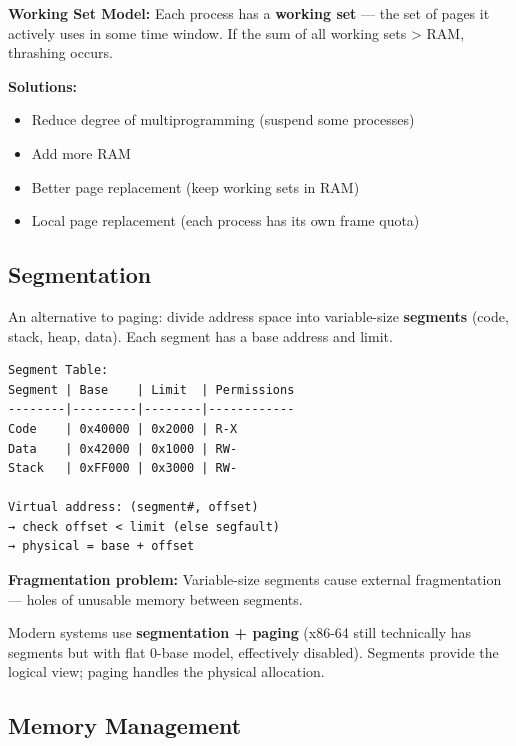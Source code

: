 \documentclass[11pt]{article}
\providecommand{\tightlist}{\setlength{\itemsep}{1pt}\setlength{\parskip}{0pt}}
\begin{document}
\textbf{Working Set Model:} Each process has a \textbf{working set} --- the set of pages it actively uses in some time window. If the sum of all working sets \textgreater{} RAM, thrashing occurs.

\textbf{Solutions:}

\begin{itemize}
\tightlist
\item
  Reduce degree of multiprogramming (suspend some processes)
\item
  Add more RAM
\item
  Better page replacement (keep working sets in RAM)
\item
  Local page replacement (each process has its own frame quota)
\end{itemize}

\subsection{Segmentation}\label{segmentation}

An alternative to paging: divide address space into variable-size \textbf{segments} (code, stack, heap, data). Each segment has a base address and limit.

\setcodelang{}

\begin{verbatim}
Segment Table:
Segment | Base    | Limit  | Permissions
--------|---------|--------|------------
Code    | 0x40000 | 0x2000 | R-X
Data    | 0x42000 | 0x1000 | RW-
Stack   | 0xFF000 | 0x3000 | RW-

Virtual address: (segment#, offset)
→ check offset < limit (else segfault)
→ physical = base + offset
\end{verbatim}

\textbf{Fragmentation problem:} Variable-size segments cause external fragmentation --- holes of unusable memory between segments.

Modern systems use \textbf{segmentation + paging} (x86-64 still technically has segments but with flat 0-base model, effectively disabled). Segments provide the logical view; paging handles the physical allocation.

\subsection{Memory Management}\label{memory-management}

\end{document}
